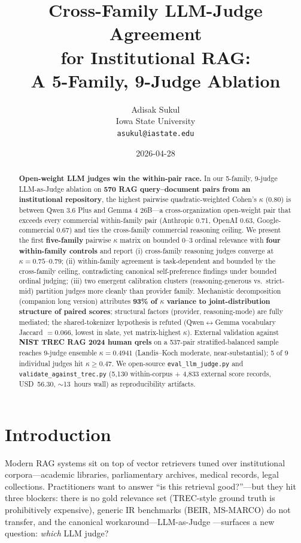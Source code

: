 \documentclass[11pt,letterpaper]{article}
\title{\bfseries Cross-Family LLM-Judge Agreement\\ for Institutional RAG: \\ A 5-Family, 9-Judge Ablation}
\author{Adisak Sukul \\
  \small Iowa State University \\
  \small \texttt{asukul@iastate.edu}}
\date{2026-04-28}
\begin{document}
\maketitle

\begin{abstract}
\noindent\textbf{Open-weight LLM judges win the within-pair race.} In our 5-family, 9-judge LLM-as-Judge ablation on \textbf{570 RAG query--document pairs from an institutional repository}, the highest pairwise quadratic-weighted Cohen's $\kappa$ (0.80) is between Qwen 3.6 Plus and Gemma 4 26B---a cross-organization open-weight pair that exceeds every commercial within-family pair (Anthropic 0.71, OpenAI 0.63, Google-commercial 0.67) and ties the cross-family commercial reasoning ceiling. We present the first \textbf{five-family} pairwise $\kappa$ matrix on bounded 0--3 ordinal relevance with \textbf{four within-family controls} and report (i) cross-family reasoning judges converge at $\kappa = 0.75$--$0.79$; (ii) within-family agreement is task-dependent and bounded by the cross-family ceiling, contradicting canonical self-preference findings under bounded ordinal judging; (iii) two emergent calibration clusters (reasoning-generous vs.\ strict-mid) partition judges more cleanly than provider family. Mechanistic decomposition (companion long version) attributes \textbf{93\% of $\kappa$ variance to joint-distribution structure of paired scores}; structural factors (provider, reasoning-mode) are fully mediated; the shared-tokenizer hypothesis is refuted (Qwen$\leftrightarrow$Gemma vocabulary Jaccard $= 0.066$, lowest in slate, yet matrix-highest $\kappa$). External validation against \textbf{NIST TREC RAG 2024 human qrels} on a 537-pair stratified-balanced sample reaches 9-judge ensemble \textbf{$\kappa = 0.4941$} (Landis--Koch moderate, near-substantial); 5 of 9 individual judges hit $\kappa \geq 0.47$. We open-source \texttt{eval\_llm\_judge.py} and \texttt{validate\_against\_trec.py} (5,130 within-corpus + 4,833 external score records, USD~56.30, $\sim$13~hours wall) as reproducibility artifacts.
\end{abstract}

\section{Introduction}\label{sec:intro}

Modern RAG systems sit on top of vector retrievers tuned over institutional corpora---academic libraries, parliamentary archives, medical records, legal collections. Practitioners want to answer ``is this retrieval good?''---but they hit three blockers: there is no gold relevance set (TREC-style ground truth is prohibitively expensive), generic IR benchmarks (BEIR, MS-MARCO) do not transfer, and the canonical workaround---LLM-as-Judge \citep{zheng2023judge,faggioli2023perspectives,rahmani2024judges,upadhyay2024umbrela}---surfaces a new question: \emph{which} LLM judge?
\end{document}
